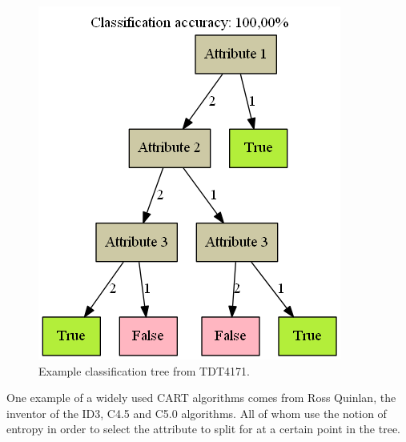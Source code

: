 	\begin{figure}[H]%
		\includegraphics[width=\columnwidth]{images/TrivialDecisionTree.png}%
		\caption{Example classification tree from TDT4171. }%
		\label{fig:decisiontree}%
	\end{figure}
	
	\bigskip\noindent
	One example of a widely used CART algorithms comes from Ross Quinlan, the inventor of the ID3, C4.5 and C5.0 algorithms. \cite{quinlan:id3, quinlan:c45}
	All of whom use the notion of entropy in order to select the attribute to split for at a certain point in the tree.
	
